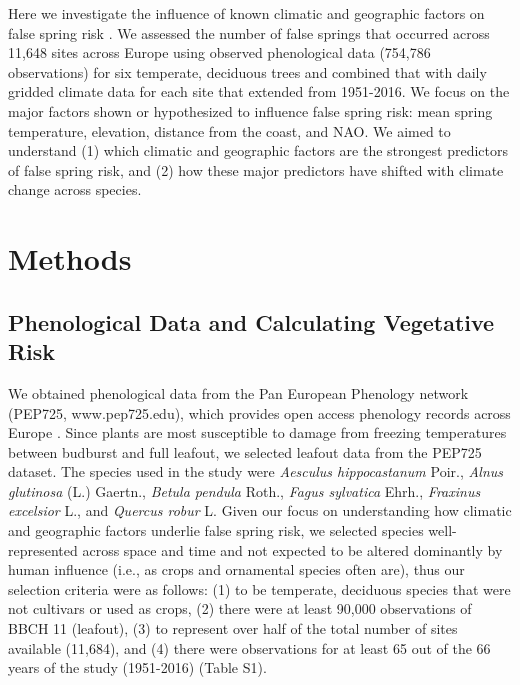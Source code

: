 \documentclass{article}\usepackage[]{graphicx}\usepackage[]{color}
\begin{document}
Here we investigate the influence of known climatic and geographic factors on false spring risk \citep[defined here as when temperatures fell below -2.2$^{\circ}$ between estimated budburst and leafout,][]{Schwartz1993}. We assessed the number of false springs that occurred across 11,648 sites across Europe using observed phenological data (754,786 observations) for six temperate, deciduous trees and combined that with daily gridded climate data for each site that extended from 1951-2016. We focus on the major factors shown or hypothesized to influence false spring risk: mean spring temperature, elevation, distance from the coast, and NAO. We aimed to understand (1) which climatic and geographic factors are the strongest predictors of false spring risk, and (2) how these major predictors have shifted with climate change across species. 

\section*{Methods} 
\subsection*{Phenological Data and Calculating Vegetative Risk}
We obtained phenological data from the Pan European Phenology network (PEP725, www.pep725.edu), which provides open access phenology records across Europe \citep{Templ2018}. Since plants are most susceptible to damage from freezing temperatures between budburst and full leafout, we selected leafout data \citep[i.e., in][BBCH 11, which is defined as the point of leaf unfolding and the first visible leaf stalk]{Meier2001} from the PEP725 dataset. The species used in the study were \textit{Aesculus hippocastanum} Poir., \textit{Alnus glutinosa} (L.) Gaertn., \textit{Betula pendula} Roth., \textit{Fagus sylvatica} Ehrh., \textit{Fraxinus excelsior} L., and \textit{Quercus robur} L. Given our focus on understanding how climatic and geographic factors underlie false spring risk, we selected species well-represented across space and time and not expected to be altered dominantly by human influence (i.e., as crops and ornamental species often are), thus our selection criteria were as follows: (1) to be temperate, deciduous species that were not cultivars or used as crops, (2) there were at least 90,000 observations of BBCH 11 (leafout), (3) to represent over half of the total number of sites available (11,684), and (4) there were observations for at least 65 out of the 66 years of the study (1951-2016) (Table S1). 
\end{document}

